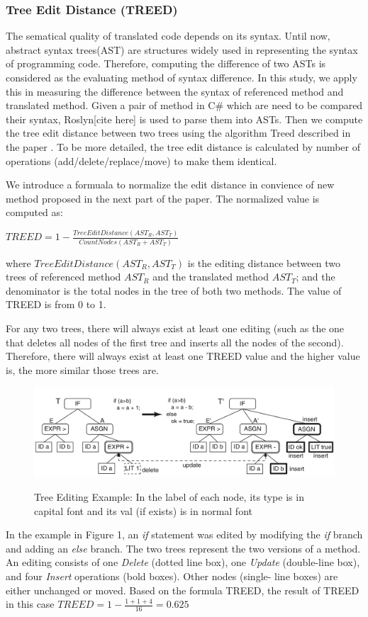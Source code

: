 \subsubsection{\textbf{Tree Edit Distance (TREED)}}  
The sematical quality of translated code depends on its syntax. Until now, abstract syntax trees(AST) are structures widely used in  representing the syntax of programming code. Therefore, computing the difference of two ASTs is considered as the evaluating method of syntax difference.
In this study, we apply this in measuring the difference between the syntax of referenced method and translated method. Given a pair of method in C\# which are need to be compared their syntax, Roslyn[cite here] is used to parse them into ASTs. Then we compute the tree edit distance between two trees using the algorithm Treed described in the paper \cite{algorithm}.
To be more detailed, the tree edit distance is calculated by number of operations (add/delete/replace/move) to make them identical. 

We introduce a formuala to normalize the edit distance in convience of new method proposed in the next part of the paper. The normalized value is computed as:

  $TREED = 1 -  \frac{TreeEditDistance\left(AST_R, AST_T\right)}{CountNodes \left(AST_R+AST_T\right)}$ 
  
where $TreeEditDistance\left(AST_R, AST_T\right)$ is the editing distance between two trees of referenced method $AST_R$ and the translated method $AST_T$; and the denominator is the total nodes in the tree of both two methods. The value of TREED is from 0 to 1. 

For any two trees, there will always exist at least one editing (such as the one that deletes all nodes of the first tree and inserts all the nodes of the second). Therefore, there will always exist at least one TREED value and the higher value is, the more similar those trees are.

\begin{figure}[h]
	\caption{Tree Editing Example: In the label of each node, its type is in capital font and its val (if exists) is in normal font}
	\includegraphics[scale=0.3]{img/treed.png}
	\centering
	\label{fig:treed}
\end{figure}

In the example in Figure 1, an \textit{if} statement was edited by modifying the \textit{if} branch and adding an \textit{else} branch. The two trees represent the two versions of a method. An editing consists of one \textit{Delete} (dotted line box), one \textit{Update} (double-line box), and four \textit{Insert} operations (bold boxes). Other nodes (single- line boxes) are either unchanged or moved. Based on the formula TREED, the result of TREED in this case  $TREED = 1 - \frac{1 + 1 + 4}{16}=0.625$




